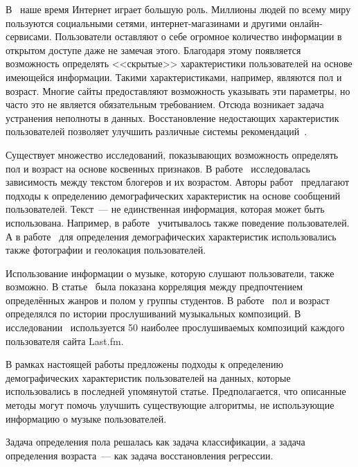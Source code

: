\startprefacepage
В~\cite{swearingen2001beyond,
adomavicius2005toward,
burger2006exploration,
peersman2011predicting,
turdakov2013opredelenie,
schwartz2013personality,
rosenthal2011age,
farseev2015harvesting,
christenson1988genre,
liu2012inferring,
wu2014gender,
deerwester1990indexing,
mikolov2013efficient,
suykens1999least,
hsu2003practical} наше время Интернет играет большую роль. Миллионы людей
по всему миру пользуются социальными сетями, интернет-магазинами
и другими онлайн-сервисами. Пользователи оставляют о себе
огромное количество информации в открытом доступе даже 
не замечая этого. Благодаря этому появляется возможность
определять <<скрытые>> характеристики пользователей на основе
имеющейся информации. Такими характеристиками, например, 
являются пол и возраст. Многие сайты предоставляют возможность 
указывать эти параметры, но часто это не является обязательным
требованием. Отсюда возникает задача устранения неполноты в 
данных. Восстановление недостающих характеристик пользователей 
позволяет улучшить различные системы
рекомендаций~\cite{recommender2001,recommender2005}.

Существует множество исследований, показывающих возможность 
определять пол и возраст на основе косвенных признаков.
В работе~\cite{burger2006} исследовалась зависимость 
между текстом блогеров и их возрастом.
Авторы работ~\cite{peersman2011,turdakov2013,schwartz2013} 
предлагают подходы к определению демографических характеристик 
на основе сообщений пользователей. Текст~--- не единственная
информация, которая может быть использована. Например, в
работе~\cite{rosenthal2011} учитывалось также
поведение пользователей. А в работе~\cite{farseev2015}
для определения демографических характеристик использовались
также фотографии и геолокация пользователей.

Использование информации о музыке, которую слушают пользователи, 
также возможно. В статье~\cite{christenson1988} была показана
корреляция между предпочтением определённых жанров и полом у
группы студентов. В работе~\cite{liu2012} пол и возраст определялся
по истории прослушиваний музыкальных композиций.
В исследовании~\cite{wu2014} используется 50 наиболее
прослушиваемых композиций каждого пользователя сайта Last.fm.

В рамках настоящей работы предложены подходы к определению
демографических характеристик пользователей на данных, которые
использовались в последней упомянутой статье. Предполагается,
что описанные методы могут помочь улучшить существующие алгоритмы,
не использующие информацию о музыке пользователей.

Задача определения пола решалась как задача 
классификации, а задача определения возраста~--- как
задача восстановления регрессии.
